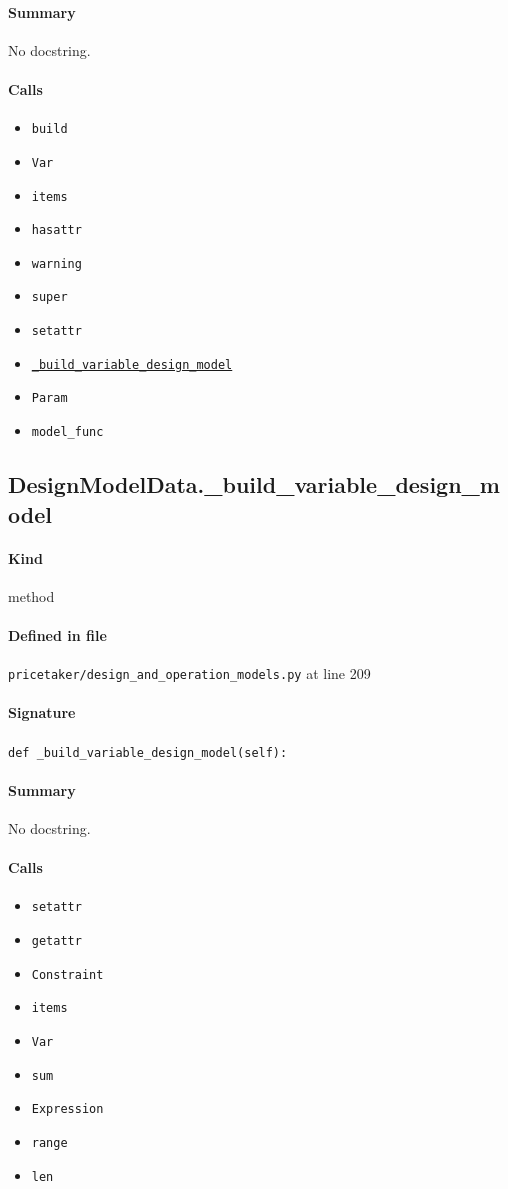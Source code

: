 \documentclass[11pt]{report}
\begin{document}
\paragraph{Summary} No docstring.
\paragraph{Calls}
\begin{itemize}[leftmargin=*]
  \item \texttt{build}
  \item \texttt{Var}
  \item \texttt{items}
  \item \texttt{hasattr}
  \item \texttt{warning}
  \item \texttt{super}
  \item \texttt{setattr}
  \item \hyperref[def:pricetaker-design_and_operation_models.py:DesignModelData._build_variable_design_model:L209]{\texttt{\_build\_variable\_design\_model}}
  \item \texttt{Param}
  \item \texttt{model\_func}
\end{itemize}
\subsection{DesignModelData.\_build\_variable\_design\_model}
\label{def:pricetaker-design_and_operation_models.py:DesignModelData._build_variable_design_model:L209}
\paragraph{Kind} method
\paragraph{Defined in file} \texttt{pricetaker/design\_and\_operation\_models.py} at line 209
\paragraph{Signature} \texttt{def \_build\_variable\_design\_model(self):}
\paragraph{Summary} No docstring.
\paragraph{Calls}
\begin{itemize}[leftmargin=*]
  \item \texttt{setattr}
  \item \texttt{getattr}
  \item \texttt{Constraint}
  \item \texttt{items}
  \item \texttt{Var}
  \item \texttt{sum}
  \item \texttt{Expression}
  \item \texttt{range}
  \item \texttt{len}
\end{itemize}
\end{document}
